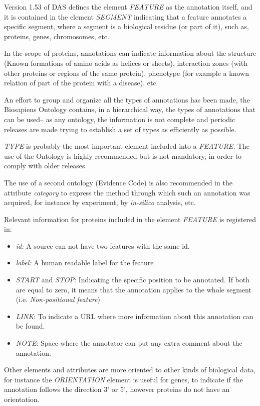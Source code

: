 Version 1.53 of DAS defines the element \emph{FEATURE} as the annotation itself, and it is contained in the element \emph{SEGMENT} indicating that a feature annotates a specific segment, where a segment is a biological residue (or part of it), such as, proteins, genes, chromosomes, etc.

In the scope of proteins, annotations can indicate information about the structure (Known formations of amino acids as helices or sheets), interaction zones (with other proteins or regions of the same protein), phenotype (for example a known relation of part of the protein with a disease), etc. 

An effort to group and organize all the types of annotations has been made, the Biosapiens Ontology contains, in a hierarchical way, the types of annotations that can be used-- as any ontology, the information is not complete and periodic releases are made trying to establish a set of types as efficiently as possible. 

\emph{TYPE} is probably the most important element included into a \emph{FEATURE}. The use of the Ontology is highly recommended but is not mandatory, in order to comply with older releases. 

The use of a second ontology (Evidence Code) is also recommended in the attribute \emph{category} to express the method through which such an annotation was acquired, for instance by experiment, by \emph{in-silico} analysis, etc.

Relevant information for proteins included in the element \emph{FEATURE} is registered in:

\begin{itemize}
 \item \emph{id:} A source can not have two features with the same id.
 \item \emph{label:} A human readable label for the feature
 \item \emph{START} and \emph{STOP}: Indicating the specific position to be annotated. If both are equal to zero, it means that the annotation applies to the whole segment (i.e. \emph{Non-positional feature})
 \item \emph{LINK}: To indicate a URL where more information about this annotation can be found.
 \item \emph{NOTE}: Space where the annotator can put any extra comment about the annotation.
\end{itemize}

Other elements and attributes are more oriented to other kinds of biological data, for instance the \emph{ORIENTATION} element is useful for genes, to indicate if the annotation follows the direction 3' or 5', however proteins do not have an orientation.

